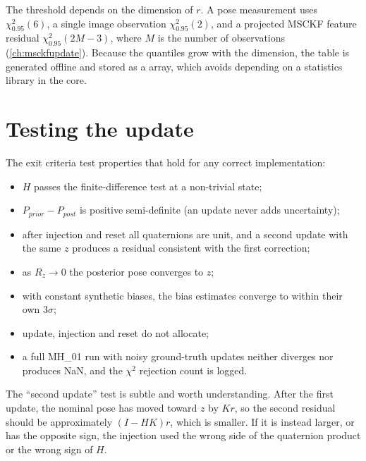 The threshold depends on the dimension of $r$. A pose measurement uses $\chi^2_{0.95}(6)$, a single image
observation $\chi^2_{0.95}(2)$, and a projected MSCKF feature residual $\chi^2_{0.95}(2M-3)$, where $M$ is the number of
observations (\cref{ch:msckfupdate}). Because the quantiles grow with the dimension, the table is generated offline
and stored as a  array, which avoids depending on a statistics library in the core.

\section{Testing the update}

\begin{projectlink}[Milestone 6]
The exit criteria test properties that hold for any correct implementation:
\begin{itemize}
  \item $H$ passes the finite-difference test at a non-trivial state;
  \item $P_{prior} - P_{post}$ is positive semi-definite (an update never adds uncertainty);
  \item after injection and reset all quaternions are unit, and a second update with the same $z$ produces a residual
        consistent with the first correction;
  \item as $R_z \to 0$ the posterior pose converges to $z$;
  \item with constant synthetic biases, the bias estimates converge to within their own $3\sigma$;
  \item update, injection and reset do not allocate;
  \item a full MH\_01 run with noisy ground-truth updates neither diverges nor produces NaN, and the $\chi^2$ rejection
        count is logged.
\end{itemize}
\end{projectlink}

The ``second update'' test is subtle and worth understanding. After the first update, the nominal pose has moved
toward $z$ by $K r$, so the second residual should be approximately $(I - HK)r$, which is smaller. If it is instead
larger, or has the opposite sign, the injection used the wrong side of the quaternion product or the wrong sign of
$H$.

